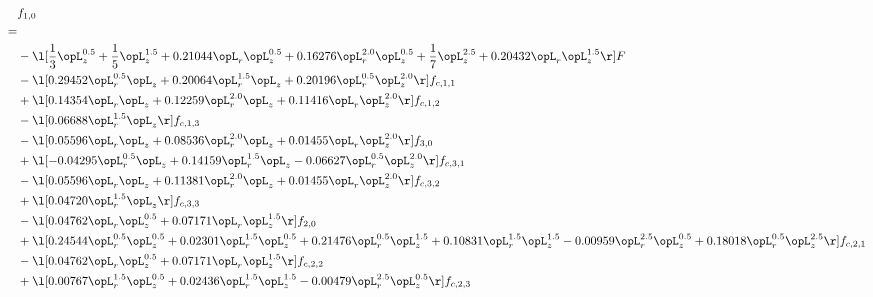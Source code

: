 \begin{alignat}{2} 
\label{eq:f_10_2} 
& f_{1,0} \nonumber \\ 
 = \\ 
& - \l[ \frac{1}{3} \opL_z^{0.5} + \frac{1}{5} \opL_z^{1.5} +  0.21044 \opL_r \opL_z^{0.5} +  0.16276 \opL_r^{2.0} \opL_z^{0.5} + \frac{1}{7} \opL_z^{2.5} +  0.20432 \opL_r \opL_z^{1.5}  \r] F \nonumber \\ 
& - \l[  0.29452 \opL_r^{0.5} \opL_z +  0.20064 \opL_r^{1.5} \opL_z +  0.20196 \opL_r^{0.5} \opL_z^{2.0}  \r] f_{c,1,1} \nonumber \\ 
& + \l[  0.14354 \opL_r \opL_z +  0.12259 \opL_r^{2.0} \opL_z +  0.11416 \opL_r \opL_z^{2.0}  \r] f_{c,1,2} \nonumber \\ 
& - \l[  0.06688 \opL_r^{1.5} \opL_z  \r] f_{c,1,3} \nonumber \\ 
& - \l[  0.05596 \opL_r \opL_z +  0.08536 \opL_r^{2.0} \opL_z +  0.01455 \opL_r \opL_z^{2.0}  \r] f_{3,0} \nonumber \\ 
& + \l[  -0.04295 \opL_r^{0.5} \opL_z +  0.14159 \opL_r^{1.5} \opL_z   -0.06627 \opL_r^{0.5} \opL_z^{2.0}  \r] f_{c,3,1} \nonumber \\ 
& - \l[  0.05596 \opL_r \opL_z +  0.11381 \opL_r^{2.0} \opL_z +  0.01455 \opL_r \opL_z^{2.0}  \r] f_{c,3,2} \nonumber \\ 
& + \l[  0.04720 \opL_r^{1.5} \opL_z  \r] f_{c,3,3} \nonumber \\ 
& - \l[  0.04762 \opL_r \opL_z^{0.5} +  0.07171 \opL_r \opL_z^{1.5}  \r] f_{2,0} \nonumber \\ 
& + \l[  0.24544 \opL_r^{0.5} \opL_z^{0.5} +  0.02301 \opL_r^{1.5} \opL_z^{0.5} +  0.21476 \opL_r^{0.5} \opL_z^{1.5} +  0.10831 \opL_r^{1.5} \opL_z^{1.5}   -0.00959 \opL_r^{2.5} \opL_z^{0.5} +  0.18018 \opL_r^{0.5} \opL_z^{2.5}  \r] f_{c,2,1} \nonumber \\ 
& - \l[  0.04762 \opL_r \opL_z^{0.5} +  0.07171 \opL_r \opL_z^{1.5}  \r] f_{c,2,2} \nonumber \\ 
& + \l[  0.00767 \opL_r^{1.5} \opL_z^{0.5} +  0.02436 \opL_r^{1.5} \opL_z^{1.5}   -0.00479 \opL_r^{2.5} \opL_z^{0.5}  \r] f_{c,2,3} \nonumber \\ 
\end{alignat} 


